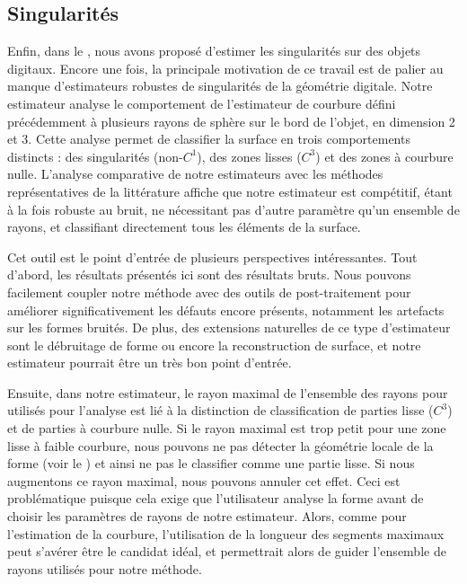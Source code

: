 \subsection*{Singularités}
%
Enfin, dans le , nous avons proposé d'estimer les
singularités sur des objets digitaux. Encore une fois, la principale motivation
de ce travail est de palier au manque d'estimateurs robustes de singularités de
la géométrie digitale. Notre estimateur analyse le comportement de l'estimateur
de courbure défini précédemment à plusieurs rayons de sphère sur le bord de
l'objet, en dimension 2 et 3. Cette analyse permet de classifier la surface en
trois comportements distincts : des singularités (non-$C^1$), des zones lisses
($C^3$) et des zones à courbure nulle. L'analyse comparative de notre
estimateurs avec les méthodes représentatives de la littérature affiche que
notre estimateur est compétitif, étant à la fois robuste au bruit, ne
nécessitant pas d'autre paramètre qu'un ensemble de rayons, et classifiant
directement tous les éléments de la surface.


Cet outil est le point d'entrée de plusieurs perspectives intéressantes. Tout
d'abord, les résultats présentés ici sont des résultats bruts. Nous pouvons
facilement coupler notre méthode avec des outils de post-traitement pour
améliorer significativement les défauts encore présents, notamment les artefacts
sur les formes bruités. De plus, des extensions naturelles de ce type
d'estimateur sont le débruitage de forme ou encore la reconstruction de surface,
et notre estimateur pourrait être un très bon point d'entrée.


Ensuite, dans notre estimateur, le rayon maximal de l'ensemble des rayons pour
utilisés pour l'analyse est lié à la distinction de classification de parties
lisse ($C^3$) et de parties à courbure nulle. Si le rayon maximal est trop petit
pour une zone lisse à faible courbure, nous pouvons ne pas détecter la géométrie
locale de la forme (voir le ) et
ainsi ne pas le classifier comme une partie lisse. Si nous augmentons ce rayon
maximal, nous pouvons annuler cet effet. Ceci est problématique puisque cela
exige que l'utilisateur analyse la forme avant de choisir les paramètres de
rayons de notre estimateur. Alors, comme pour l'estimation de la courbure,
l'utilisation de la longueur des segments maximaux peut s’avérer être le
candidat idéal, et permettrait alors de guider l'ensemble de rayons utilisés
pour notre méthode.


